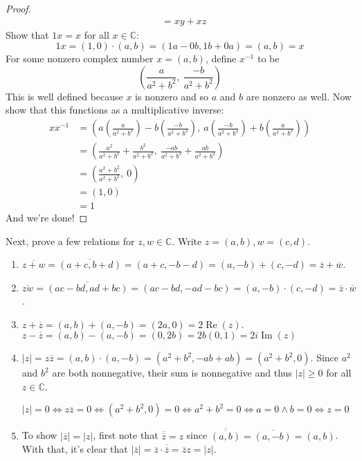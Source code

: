 \documentclass[11pt, oneside]{article}
\newcommand{\C}{\mathbb{C}}
\begin{document}
\begin{proof}
\begin{align*}
        &= xy + xz
    \end{align*}
    Show that $1x = x$ for all $x \in \C$:
    $$1x = (1, 0) \cdot (a, b) = (1a - 0b, 1b + 0a) = (a, b) = x$$
    For some nonzero complex number $x = (a, b)$, define $x^{-1}$ to be
    $$\left(\frac{a}{a^2 + b^2}, \ \frac{-b}{a^2 + b^2} \right)$$
    This is well defined because $x$ is nonzero and so $a$ and $b$ are nonzero as well. Now show that this functions as a multiplicative inverse:
    \begin{align*}
        xx^{-1} &= \left(a \left(\frac{a}{a^2 + b^2} \right) - b\left(\frac{-b}{a^2 + b^2}\right), \ a \left(\frac{-b}{a^2 + b^2}\right) + b \left(\frac{a}{a^2 + b^2}\right)\right) \\
        &= \left( \frac{a^2}{a^2 + b^2} + \frac{b^2}{a^2 + b^2}, \ \frac{-ab}{a^2 + b^2} + \frac{ab}{a^2 + b^2} \right) \\
        &= \left( \frac{a^2 + b^2}{a^2 + b^2}, \ 0 \right) \\
        &= \left( 1, 0 \right) \\
        &= 1
    \end{align*}
And we're done!
\end{proof}
Next, prove a few relations for $z, w \in \C$. Write $z = (a, b), w = (c, d)$.
\begin{enumerate}
    \item $\overline{z + w} = \overline{(a + c, b + d)} = (a + c, -b - d) = (a, - b) + (c, -d) = \overline{z} + \overline{w}$.
    \item $\overline{zw} = \overline{(ac - bd, ad + bc)} = (ac - bd, -ad - bc) = (a, -b) \cdot (c, -d) = \overline{z} \cdot \overline{w}$.
    \item $z + \overline{z} = (a, b) + (a, - b) = (2a, 0) = 2 \operatorname{Re}(z)$.\\
    $z - \overline{z} = (a, b) - (a, -b) = (0, 2b) = 2b (0, 1) = 2i \operatorname{Im}(z)$
    \item $|z| = z\overline{z} = (a, b) \cdot (a, -b) = (a^2 + b^2, -ab + ab) = (a^2 + b^2, 0)$. Since $a^2$ and $b^2$ are both nonnegative, their sum is nonnegative and thus $|z| \geq 0$ for all $z \in \C$.
    
    $|z| = 0 \iff z\overline{z} = 0 \iff (a^2 + b^2, 0) = 0 \iff a^2 + b^2 = 0 \iff a = 0 \wedge b = 0 \iff z = 0$
    \item To show $|\overline{z}| = |z|$, first note that $\overline{\overline{z}} = z$ since $\overline{\overline{(a, b)}} = \overline{(a, -b)} = (a, b)$.
    With that, it's clear that $|\overline{z}| = \overline{z} \cdot \overline{\overline{z}} = \overline{z} z = |z|$.
\end{enumerate}
\end{document}
